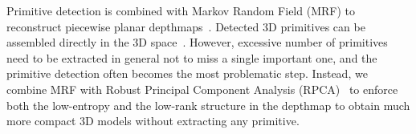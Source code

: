 Primitive detection is combined with Markov Random Field (MRF) to
reconstruct piecewise planar depthmaps~\cite{ManhattanWorldStereo}.
Detected 3D primitives can be assembled directly in the 3D
space~\cite{eccv_museum}.  However, excessive number of primitives need
to be extracted in general not to miss a single important one, and the
primitive detection often becomes the most problematic step. Instead, we
combine MRF with Robust Principal Component Analysis
(RPCA)~\cite{Candes2011} to enforce both the low-entropy and the
low-rank structure in the depthmap to obtain much more compact 3D models
without extracting any primitive.

%
%



